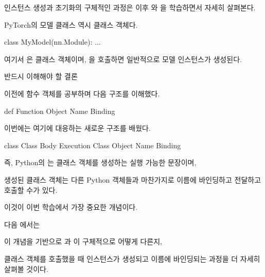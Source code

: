 인스턴스 생성과 초기화의 구체적인 과정은 이후 와 을 학습하면서 자세히 살펴본다.

\begin{dhknote}
\begin{dhksmry}[centered]
PyTorch의 모델 클래스 역시 클래스 객체다.
\end{dhksmry}
\end{dhknote}

\begin{dhkcode}
class MyModel(nn.Module):
    ...
\end{dhkcode}

여기서 은 클래스 객체이며, 을 호출하면 일반적으로 모델 인스턴스가 생성된다.

\begin{dhknote}
\begin{dhksmry}[centered]
반드시 이해해야 할 결론
\end{dhksmry}
\end{dhknote}

이전에 함수 객체를 공부하며 다음 구조를 이해했다.

\begin{dhksmry}[centered]
def \ra Function Object \ra Name Binding
\end{dhksmry}

이번에는 여기에 대응하는 새로운 구조를 배웠다.

\begin{dhksmry}[centered]
class \ra Class Body Execution \ra Class Object \ra Name Binding
\end{dhksmry}

즉, Python의 는 클래스 객체를 생성하는 실행 가능한 문장이며,

생성된 클래스 객체는 다른 Python 객체들과 마찬가지로 이름에 바인딩하고 전달하고 호출할 수가 있다.

이것이 이번 학습에서 가장 중요한 개념이다.

다음 에서는

이 개념을 기반으로 과 이 구체적으로 어떻게 다른지, 

클래스 객체를 호출했을 때 인스턴스가 생성되고 이름에 바인딩되는 과정을 더 자세히 살펴볼 것이다.
